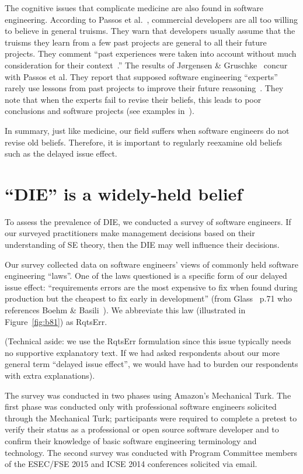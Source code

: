 \documentclass[smallcondesed]{svjour3}
\newcommand{\fig}[1]{Figure~\ref{fig:#1}}
\begin{document}
The cognitive issues that complicate medicine are also found in software engineering.
According to Passos et al.~\cite{passos11}, commercial developers
are all too willing to believe in general
truisms.
They  warn that developers
usually assume that the truisms they learn from a few past
projects are general to 
all their future projects. They comment ``past experiences were taken into account without 
much consideration for their context~\cite{passos11}.''  
The results of J{\o}rgensen \& Gruschke~\cite{jorgensen09} concur with Passos et al. They report that 
  supposed software engineering    ``experts'' rarely use lessons
  from past projects to improve their future reasoning~\cite{jorgensen09}. 
 They note that
when the experts
  fail to revise their beliefs, this leads to poor
 conclusions and software projects  (see examples in~\cite{jorgensen09}).
 

In summary, just like medicine, our field suffers when
 software engineers do  not revise old beliefs.  Therefore, it is important
 to regularly  reexamine    old beliefs such as the delayed issue effect.
  
 
 
\section{``DIE'' is a  widely-held belief}
To assess the prevalence of DIE,   we conducted a survey of software engineers. If our surveyed practitioners make management decisions based on their
understanding of SE theory, then the DIE  may well influence their decisions.






Our survey collected data on software engineers' views of commonly held software engineering ``laws''.
One of the laws questioned is a specific form of our delayed issue effect:  ``requirements errors are the most expensive to fix when found during production but the cheapest to fix early in development'' (from Glass~\cite{glass02} p.71 who references Boehm \& Basili~\cite{boehm01}). We abbreviate this law (illustrated in \fig{b81}) as RqtsErr.

(Technical aside: we use the RqtsErr formulation since this issue typically needs no supportive explanatory
text. If we had asked respondents about our more general term ``delayed issue
effect'', we would have had to burden our respondents with extra explanations).

The survey was conducted in two phases using Amazon's Mechanical Turk. The first phase was conducted only with professional software engineers solicited through the Mechanical Turk;
participants were required to complete a pretest to verify their status as a professional or open source software developer and to confirm their knowledge of basic software engineering terminology and technology. The  second survey was conducted with Program Committee members of the ESEC/FSE 2015 and ICSE 2014  conferences solicited via email.
\end{document}
